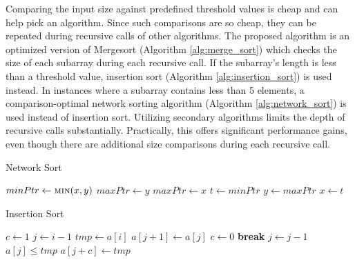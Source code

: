 \documentclass[12pt, conference]{ieeeconf}
\begin{document}
Comparing the input size against predefined threshold values is cheap and can
help pick an algorithm. Since such comparisons are so cheap, they can be
repeated during recursive calls of other algorithms. The proposed algorithm is
an optimized version of Mergesort (Algorithm \ref{alg:merge_sort}) which checks
the size of each subarray during each recursive call. If the subarray's length
is less than a threshold value, insertion sort (Algorithm
\ref{alg:insertion_sort}) is used instead. In instances where a subarray
contains less than 5 elements, a comparison-optimal network sorting algorithm
(Algorithm \ref{alg:network_sort}) is used instead of insertion sort. Utilizing
secondary algorithms limits the depth of recursive calls substantially.
Practically, this offers significant performance gains, even though there are
additional size comparisons during each recursive
call\parencite{the_basic_algorithms}.

\begin{algorithm}[H]
	\caption{Network Sort}
	\label{alg:network_sort}
	\begin{algorithmic}
		\State $minPtr \gets \Call{min}{x, y}$
		\State $maxPtr \gets y$
		\Else
		\State $maxPtr \gets x$
		\EndIf
		\State $t \gets minPtr$
		\State $y \gets maxPtr$
		\State $x \gets t$
		\EndProcedure

		\State {}
		\State {}
		\State {}
		\EndProcedure

		\State {}
		\State {}
		\State {}
		\State {}
		\State {}
		\EndProcedure
	\end{algorithmic}
\end{algorithm}

\begin{algorithm}[H]
	\caption{Insertion Sort}
	\label{alg:insertion_sort}
	\begin{algorithmic}
		\Procedure{INS\_SORT}{a, n}
		\For {$i \gets 1$ to $n$}
		\State $c \gets 1$
		\State $j \gets i - 1$
		\If {$a[j] > a[i]$}
		\State $tmp \gets a[i]$
		\Repeat
		\State $a[j + 1] \gets a[j]$
		\If {$j = 0$}
		\State $c \gets 0$
		\State \textbf{break}
		\EndIf
		\State $j \gets j - 1$
		\Until $a[j] \le tmp$
		\State $a[j + c] \gets tmp$
		\EndIf
		\EndFor
		\EndProcedure
	\end{algorithmic}
\end{algorithm}
\end{document}
